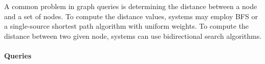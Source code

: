 
A common problem in graph queries is determining the distance between a node and a set of nodes. To compute the distance values, systems may employ BFS or a single-source shortest path algorithm with uniform weights.
To compute the distance between two given node, systems can use bidirectional search algorithms.


\paragraph{Queries}
{\raggedright

}